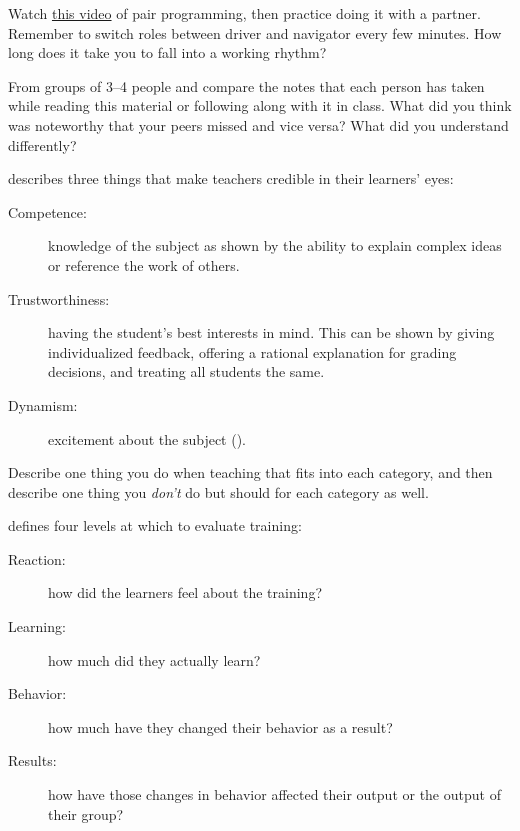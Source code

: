 
Watch \href{https://www.youtube.com/watch?v=vgkahOzFH2Q}{this video}
of pair programming, then practice doing it with a partner.  Remember
to switch roles between driver and navigator every few minutes.  How
long does it take you to fall into a working rhythm?


From groups of 3--4 people and compare the notes that each person has
taken while reading this material or following along with it in class.
What did you think was noteworthy that your peers missed and vice
versa?  What did you understand differently?


\cite{Fink2013} describes three things that make teachers credible in
their learners' eyes:

\begin{description}

\item[Competence:] knowledge of the subject as shown by the ability
  to explain complex ideas or reference the work of others.

\item[Trustworthiness:] having the student's best interests in
  mind. This can be shown by giving individualized feedback, offering
  a rational explanation for grading decisions, and treating all
  students the same.

\item[Dynamism:] excitement about the subject
  ().

\end{description}

Describe one thing you do when teaching that fits into each category,
and then describe one thing you \emph{don't} do but should for each
category as well.


\cite{Kirk1994} defines four levels at which to evaluate training:

\begin{description}

\item[Reaction:] how did the learners feel about the training?

\item[Learning:] how much did they actually learn?

\item[Behavior:] how much have they changed their behavior as a
  result?

\item[Results:] how have those changes in behavior affected their
  output or the output of their group?

\end{description}

